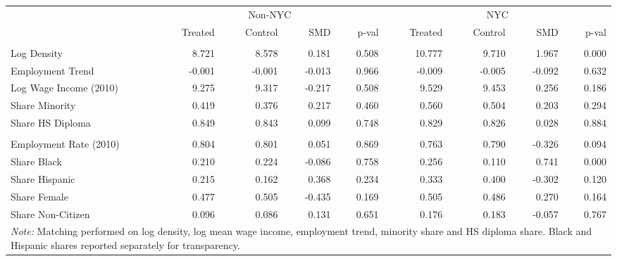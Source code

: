 
\begin{tabular}[t]{lrrrrrrrr}
\toprule
\multicolumn{1}{c}{ } & \multicolumn{4}{c}{Non-NYC} & \multicolumn{4}{c}{NYC} \\
\cmidrule(l{3pt}r{3pt}){2-5} \cmidrule(l{3pt}r{3pt}){6-9}
 & Treated & Control & SMD & p-val & Treated & Control & SMD & p-val\\
\midrule
\addlinespace[0.3em]
\multicolumn{9}{l}{\textbf{Matching Variables}}\\
\hspace{1em}Log Density & 8.721 & 8.578 & 0.181 & 0.508 & 10.777 & 9.710 & 1.967 & 0.000\\
\hspace{1em}Employment Trend & -0.001 & -0.001 & -0.013 & 0.966 & -0.009 & -0.005 & -0.092 & 0.632\\
\hspace{1em}Log Wage Income (2010) & 9.275 & 9.317 & -0.217 & 0.508 & 9.529 & 9.453 & 0.256 & 0.186\\
\hspace{1em}Share Minority & 0.419 & 0.376 & 0.217 & 0.460 & 0.560 & 0.504 & 0.203 & 0.294\\
\hspace{1em}Share HS Diploma & 0.849 & 0.843 & 0.099 & 0.748 & 0.829 & 0.826 & 0.028 & 0.884\\
\addlinespace[0.3em]
\multicolumn{9}{l}{\textbf{Additional Covariates}}\\
\hspace{1em}Employment Rate (2010) & 0.804 & 0.801 & 0.051 & 0.869 & 0.763 & 0.790 & -0.326 & 0.094\\
\hspace{1em}Share Black & 0.210 & 0.224 & -0.086 & 0.758 & 0.256 & 0.110 & 0.741 & 0.000\\
\hspace{1em}Share Hispanic & 0.215 & 0.162 & 0.368 & 0.234 & 0.333 & 0.400 & -0.302 & 0.120\\
\hspace{1em}Share Female & 0.477 & 0.505 & -0.435 & 0.169 & 0.505 & 0.486 & 0.270 & 0.164\\
\hspace{1em}Share Non-Citizen & 0.096 & 0.086 & 0.131 & 0.651 & 0.176 & 0.183 & -0.057 & 0.767\\
\bottomrule
\multicolumn{9}{l}{\rule{0pt}{1em}\textit{Note:} Matching performed on log density, log mean wage income, employment trend, minority share and HS diploma share. Black and Hispanic shares reported separately for transparency.}\\
\end{tabular}
